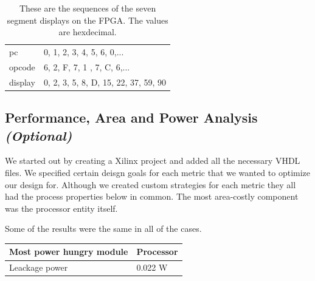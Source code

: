 \documentclass[a4paper,11pt]{article}
\begin{document}
\begin{table}[h!]
\centering
\begin{tabular}{|l|l|} \hline
  pc & 0, 1, 2, 3, 4, 5, 6, 0,...\\
  opcode & 6, 2, F, 7, 1 , 7, C, 6,... \\
  display & 0, 2, 3, 5, 8, D, 15, 22, 37, 59, 90\\ \hline
\end{tabular}
\label{tab:sequences}
\caption{These are the sequences of the seven segment displays on the FPGA. The values are hexdecimal.}
\end{table}

\newpage
\subsection{Performance, Area and Power Analysis \emph{(Optional)}}

We started out by creating a Xilinx project and added all the necessary VHDL files. We specified certain deisgn goals for each metric that we wanted to optimize our design for. Although we created custom strategies for each metric they all had the process properties below in common. The most area-costly component was the processor entity itself. 


Some of the results were the same in all of the cases.

\begin{tabular}{|l|l|} \hline
  Most power hungry module & Processor \\ \hline
  Leackage power & 0.022 W \\ \hline
\end{tabular}
\end{document}
